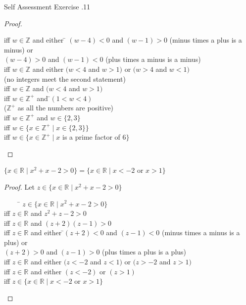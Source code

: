 \documentclass[\main/notes.tex]{subfiles}
\begin{document}
\begin{exercise}{Self Assessment Exercise \thechapter.11}
\begin{questions}
\begin{questions}
\begin{answer}
\begin{proof}
\begin{tabbing}
											iff \> $w \in \mathbb{Z}$ and either \= $(w - 4) < 0$ and $(w - 1) > 0$ (minus times a plus is a minus) or\\
											\> \> $(w - 4) > 0$ and $(w - 1) < 0$ (plus times a minus is a minus)\\
											iff \> $w \in \mathbb{Z}$ and either $(w < 4$ and $w > 1)$ or $(w > 4$ and $w < 1)$\\
											\> \> (no integers meet the second statement)\\
											iff \> $w \in \mathbb{Z}$ and $(w < 4$ and $w > 1)$\\
											iff \> $w \in \mathbb{Z}^{+}$ and \=$(1 < w < 4)$\\
											\> \> ($\mathbb{Z}^{+}$ as all the numbers are positive)\\
											iff \> $w \in \mathbb{Z}^{+}$ and $w \in \{2, 3\}$\\
											iff \> $w \in \{x \in \mathbb{Z}^{+} \mid x \in \{2, 3\}\}$\\
											iff \> $w \in \{x \in \mathbb{Z}^{+} \mid x$ is a prime factor of $6\}$
										\end{tabbing}
									\end{proof}
								\end{answer}
							\item $\{x \in \mathbb{R} \mid x^{2} + x - 2 > 0\} = \{x \in \mathbb{R} \mid x < -2$ or $x > 1\}$
								\begin{answer}
									\begin{proof}
										Let $z \in \{x \in \mathbb{R} \mid x^{2} + x - 2 > 0\}$
										\begin{tabbing}
											$\qquad$ \= $z \in \{x \in \mathbb{R} \mid x^{2} + x - 2 > 0\}$\\
											iff \> $z \in \mathbb{R}$ and $z^{2} + z - 2 > 0$\\
											iff \> $z \in \mathbb{R}$ and $(z + 2)(z - 1) > 0$\\
											iff \> $z \in \mathbb{R}$ and either \=$(z + 2) < 0$ and $(z - 1) < 0$ (minus times a minus is a plus) or\\
											\> \> $(z + 2)> 0$ and $(z - 1) > 0$ (plus times a plus is a plus)\\
											iff \> $z \in \mathbb{R}$ and either $(z < -2$ and $z < 1)$ or $(z > -2$ and $z > 1)$\\
											iff \> $z \in \mathbb{R}$ and either $(z < -2)$ or $(z > 1)$\\
											iff \> $z \in \{x \in \mathbb{R} \mid x < -2$ or $x > 1\}$
										\end{tabbing}
									\end{proof}
								\end{answer}
						\end{questions}
				\end{questions}
			\end{exercise}
\end{document}
